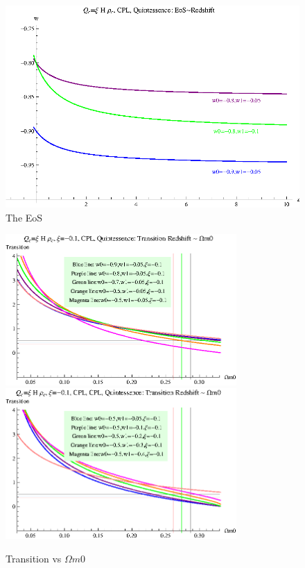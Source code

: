 \documentclass[12pt,a4paper]{article}
\begin{document}
\begin{figure}
\centering
\includegraphics[width=500pt]{rhoc_ICCPL_Quint_EoS.eps}
\caption{The EoS}\label{fig-rhoc_ICCPL_Quint_EoS}
\end{figure}

\begin{figure}
\centering
\includegraphics[width=250pt]{rhoc_ICCPL_Quint_TransVSOmegam01.eps}
\includegraphics[width=250pt]{rhoc_ICCPL_Quint_TransVSOmegam02.eps}
\caption{Transition vs $\Omega m0$}\label{fig-rhoc_ICCPL_Quint_TransVSOmegam0}
\end{figure}
\end{document}
